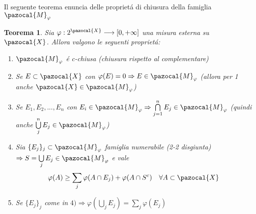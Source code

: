 \documentclass[11pt,a4paper]{report}
\theoremstyle{plain}
\newtheorem{thm}{Teorema}[chapter] %
\theoremstyle{definition}
\newcommand{\M}{\pazocal{M}_\varphi}
\begin{document}
Il seguente teorema enuncia delle propriet\'a di chiusura della famiglia $\pazocal{M}_\varphi$
\begin{thm}
Sia $\varphi : 2^\pazocal{X} \longrightarrow [0,+\infty]$ una misura esterna su $\pazocal{X}$. Allora valgono le seguenti propriet\'a:
\begin{enumerate}
	\item $\pazocal{M}_\varphi$ \'e c-chiusa (chiusura rispetto al complementare)
	\item Se $E \subset \pazocal{X}$ con $\varphi(E)=0 \Rightarrow E \in \pazocal{M}_\varphi$ (allora per 1 anche $\pazocal{X} \in \pazocal{M}_\varphi$)
	\item Se $E_1,E_2,...,E_n$ con $E_i \in \pazocal{M}_\varphi \Rightarrow \bigcap\limits_{j=1}^{n}E_j \in \M$ (quindi anche $\bigcup\limits_{j}^nE_j \in \M$)
	\item Sia $\{E_j\}_j \subset \M$ famiglia numerabile (2-2 disgiunta) $\Rightarrow S=\bigcup\limits_{j}E_j \in \M$ e vale
	\[
		\varphi(A) \ge \sum\limits_{j} \varphi(A \cap E_j) + \varphi(A \cap S^c)\ \ \ \forall A \subset \pazocal{X}
	\]
	\item Se $\{E_j\}_j$ come in $4) \Rightarrow \varphi(\bigcup\limits_{j}E_j) = \sum\limits_{j}\varphi(E_j)$
\end{enumerate}
\end{thm}
\end{document}

